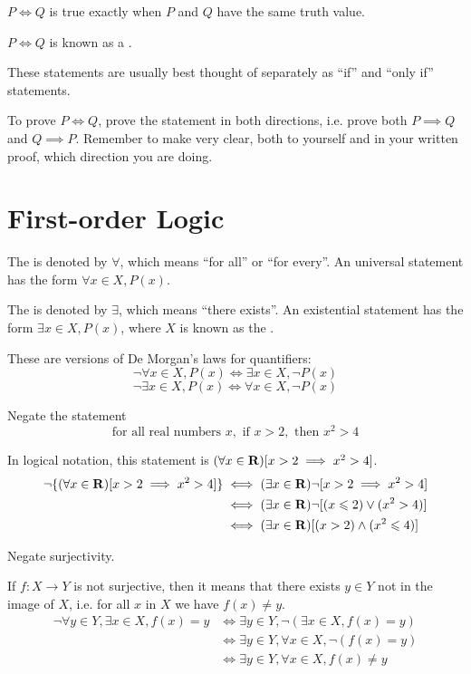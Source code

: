 $P \iff Q$ is true exactly when $P$ and $Q$ have the same truth value.

$P \iff Q$ is known as a .

These statements are usually best thought of separately as ``if'' and ``only if'' statements.

To prove $P \iff Q$, prove the statement in both directions, i.e. prove both $P \implies Q$ and $Q \implies P$. Remember to make very clear, both to yourself and in your written proof, which direction you are doing.

\section{First-order Logic}
The  is denoted by $\forall$, which means ``for all'' or ``for every''. An universal statement has the form $\forall x\in X, P(x)$.

The  is denoted by $\exists$, which means ``there exists''. An existential statement has the form $\exists x\in X, P(x)$, where $X$ is known as the .

These are versions of De Morgan's laws for quantifiers:
\[ \lnot \forall x\in X,P(x) \iff \exists x\in X,\lnot P(x) \]
\[ \lnot \exists x\in X,P(x) \iff \forall x\in X,\lnot P(x) \]

\begin{exercise}
Negate the statement
\[ \text{for all real numbers } x, \text{ if } x>2, \text{ then } x^2>4 \]
\end{exercise}
\begin{solution}
In logical notation, this statement is $(\forall x \in \mathbf R)[x>2 \implies x^2>4]$.
\begin{align*}
\lnot\{(\forall x \in \mathbf R)[x>2 \implies x^2>4]\} 
&\iff (\exists x \in \mathbf R) \lnot[x>2 \implies x^2>4] \\
&\iff (\exists x \in \mathbf R) \lnot [(x\leqslant2) \lor (x^2>4)] \\
&\iff (\exists x \in \mathbf R) [(x>2) \land (x^2\leqslant4)]
\end{align*}
\end{solution}

\begin{exercise}
Negate surjectivity.
\end{exercise}
\begin{solution}
If $f:X\to Y$ is not surjective, then it means that there exists $y \in Y$ not in the image of $X$, i.e. for all $x$ in $X$ we have $f(x)\neq y$.
\begin{align*}
\lnot \forall y \in Y, \exists x \in X, f(x)=y 
&\iff \exists y \in Y, \lnot (\exists x \in X, f(x)=y) \\
&\iff \exists y \in Y, \forall x \in X, \lnot (f(x)=y) \\
&\iff \exists y \in Y, \forall x \in X, f(x) \neq y
\end{align*}
\end{solution}

